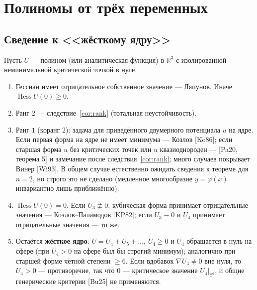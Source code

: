 \documentclass[11pt,a4paper]{article}
\theoremstyle{definition}
\newcommand{\R}{\mathbb R}
\DeclareMathOperator{\Hess}{Hess}
\begin{document}
\section{Полиномы от трёх переменных}\label{sec:3d}

\subsection{Сведение к <<жёсткому ядру>>}
Пусть $U$ --- полином (или аналитическая функция) в $\R^3$ с изолированной неминимальной критической
точкой в нуле.
\begin{enumerate}[leftmargin=*]
\item Гессиан имеет отрицательное собственное значение --- Ляпунов. Иначе $\Hess U(0)\ge0$.
\item Ранг $2$ --- следствие~\ref{cor:rank} (тотальная неустойчивость).
\item Ранг $1$ (коранг 2): задача для приведённого двумерного потенциала $u$ на ядре. Если первая форма
на ядре не имеет минимума --- Козлов [Ko86]; если старшая форма $u$ без критических точек или $u$
квазиоднороден --- [Pa20, теорема 5] и замечание после следствия~\ref{cor:rank}; много случаев покрывает
Винер [Wi93]. В общем случае естественно ожидать сведения к теореме для $n=2$, но строго это не сделано
(медленное многообразие $y=\varphi(x)$ инвариантно лишь приближённо).
\item $\Hess U(0)=0$. Если $U_3\not\equiv0$, кубическая форма принимает отрицательные значения ---
Козлов--Паламодов [KP82]; если $U_3\equiv0$ и $U_4$ принимает отрицательные значения --- то же.
\item Остаётся \textbf{жёсткое ядро}: $U=U_4+U_5+\dots$, $U_4\ge0$ и $U_4$ обращается в нуль на сфере
(при $U_4>0$ на сфере был бы строгий минимум); аналогично при старшей форме чётной степени $\ge6$.
Если вдобавок $\nabla U_4\ne0$ вне нуля, то $U_4>0$ --- противоречие, так что $0$ --- критическое
значение $U_4|_{S^2}$, и общие генерические критерии [Bu25] не применяются.
\end{enumerate}
\end{document}
